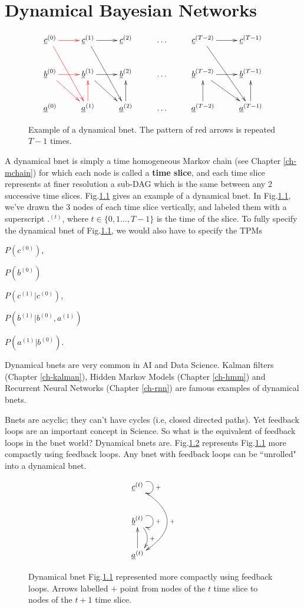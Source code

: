\chapter{Dynamical Bayesian Networks}
\label{ch-dyn-bnet}

\begin{figure}[h!]
$$
\xymatrix{
\rvc^{(0)}\ar@[red][r]\ar@[red][rdd]
&\rvc^{(1)}\ar[r]\ar[rdd]
&\rvc^{(2)}
&\ldots
&\rvc^{(T-2)}\ar[r]\ar[rdd]
&\rvc^{(T-1)}
\\
\rvb^{(0)}\ar@[red][rd]\ar@[red][r]
&\rvb^{(1)}\ar[rd]\ar[r]
&\rvb^{(2)}
&\ldots
&\rvb^{(T-2)}\ar[rd]\ar[r]
&\rvb^{(T-1)}
\\
\rva^{(0)}
&\rva^{(1)}\ar@[red][u]
&\rva^{(2)}\ar[u]
&\ldots
&\rva^{(T-2)}\ar[u]
&\rva^{(T-1)}\ar[u]
}$$
\caption{
Example of a dynamical bnet. The
pattern of red arrows is repeated $T-1$ times.
}
\label{fig-dyn-bnet}
\end{figure}



A dynamical bnet is simply
a time homogeneous Markov chain (see Chapter
\ref{ch-mchain})
for which each node is 
called a {\bf time slice},
and each time slice 
represents
at finer resolution a sub-DAG
which is the same 
between any
2 successive time slices.
Fig.\ref{fig-dyn-bnet} gives an example
of a dynamical bnet.
In Fig.\ref{fig-dyn-bnet},
we've drawn the 3 nodes of
each time slice vertically,
and labeled them
with a superscript ${.}^{(t)}$,
where $t\in \{
0,1 \ldots, T-1\}$ 
is the time
of the slice.
To fully 
specify the
dynamical bnet
of Fig.\ref{fig-dyn-bnet},
we would also have to specify
the TPMs 

$P(c^{(0)})$, 

$P(b^{(0)})$

$P(c^{(1)}|c^{(0)})$,
 
$P(b^{(1)}|b^{(0)}, a^{(1)})$

$P(a^{(1)}|b^{(0)})$.

Dynamical bnets
are very common
in AI and Data Science.
Kalman filters (Chapter \ref{ch-kalman}),
Hidden Markov Models (Chapter \ref{ch-hmm})
and
Recurrent Neural Networks 
(Chapter \ref{ch-rnn})
are famous examples of dynamical bnets.

Bnets are acyclic; they can't have cycles
(i.e, closed directed paths).
Yet feedback loops are an important
concept in Science. So what is
the equivalent of feedback loops in the
bnet world? Dynamical bnets are.
Fig.\ref{fig-dyn-bnet-compact}
represents
Fig.\ref{fig-dyn-bnet} more 
compactly using feedback loops. 
Any bnet with feedback loops
can be ``unrolled" into a dynamical bnet.


\begin{figure}[h!]
$$
\xymatrix{
\rvc^{(t)}
\ar@/^3pc/[dd]^+
\ar@(ur,dr)[]^+
\\
\rvb^{(t)}
\ar@/^1pc/[d]^+
\ar@(ur,dr)[]^+
\\
\rva^{(t)}\ar[u]
}$$
\caption{
Dynamical bnet Fig.\ref{fig-dyn-bnet}
represented 
more compactly using feedback loops.
Arrows labelled $+$
point from nodes of the $t$ time slice
to nodes of the $t+1$ time slice.
}
\label{fig-dyn-bnet-compact}
\end{figure}
